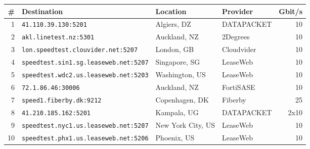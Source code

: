 \begin{tabular}{rlllr}
\toprule
\# & Destination & Location & Provider & Gbit/s \\
\midrule
1 & \texttt{41.\allowbreak{}110.\allowbreak{}39.\allowbreak{}130:5201} & Algiers, DZ & DATAPACKET & 10 \\
2 & \texttt{akl.\allowbreak{}linetest.\allowbreak{}nz:5301} & Auckland, NZ & 2Degrees & 10 \\
3 & \texttt{lon.\allowbreak{}speedtest.\allowbreak{}clouvider.\allowbreak{}net:5207} & London, GB & Cloudvider & 10 \\
4 & \texttt{speedtest.\allowbreak{}sin1.\allowbreak{}sg.\allowbreak{}leaseweb.\allowbreak{}net:5207} & Singapore, SG & LeaseWeb & 10 \\
5 & \texttt{speedtest.\allowbreak{}wdc2.\allowbreak{}us.\allowbreak{}leaseweb.\allowbreak{}net:5203} & Washington, US & LeaseWeb & 10 \\
6 & \texttt{72.\allowbreak{}1.\allowbreak{}86.\allowbreak{}46:30006} & Auckland, NZ & FortiSASE & 10 \\
7 & \texttt{speed1.\allowbreak{}fiberby.\allowbreak{}dk:9212} & Copenhagen, DK & Fiberby & 25 \\
8 & \texttt{41.\allowbreak{}210.\allowbreak{}185.\allowbreak{}162:5201} & Kampala, UG & DATAPACKET & 2x10 \\
9 & \texttt{speedtest.\allowbreak{}nyc1.\allowbreak{}us.\allowbreak{}leaseweb.\allowbreak{}net:5207} & New York City, US & LeaseWeb & 10 \\
10 & \texttt{speedtest.\allowbreak{}phx1.\allowbreak{}us.\allowbreak{}leaseweb.\allowbreak{}net:5206} & Phoenix, US & LeaseWeb & 10 \\
\bottomrule
\end{tabular}
